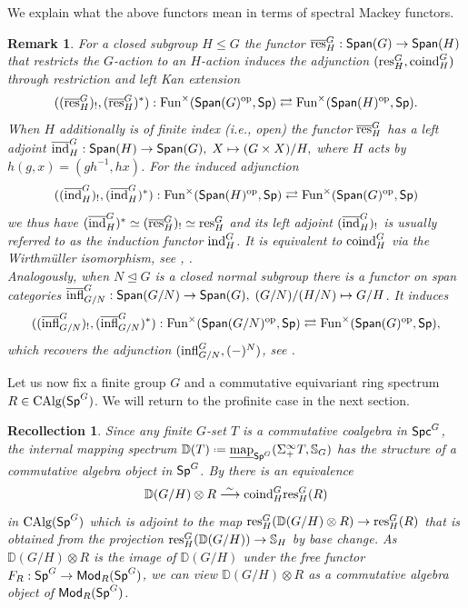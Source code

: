 \documentclass[reqno]{amsart}
\numberwithin{equation}{section}\theoremstyle{thms}
\theoremstyle{defn}
\newtheorem{rem}[equation]{Remark}
\newtheorem{rec}[equation]{Recollection}
\newcommand{\bD}{\mathbb{D}}
\newcommand{\bS}{\mathbb{S}}
\newcommand{\tn}[1]{\textnormal{#1}}
\newcommand{\tsf}[1]{\textsf{\textup{#1}}}
\newcommand{\underl}[1]{\underline{#1}}
\newcommand{\overl}[1]{\overline{#1}}
\newcommand*{\defeq}{\mathrel{\vcenter{\baselineskip0.4ex \lineskiplimit0pt
\hbox{\scriptsize.}\hbox{\scriptsize.}}}%
=}
\newcommand{\op}{\tn{op}}
\newcommand{\fun}{\tn{Fun}}
\newcommand{\imap}{\underl{\tn{map}}}
\newcommand{\calg}{\tn{CAlg}}
\newcommand{\Mod}{\tsf{Mod}}
\newcommand{\Spans}{\tsf{Span}}
\newcommand{\spec}{\tsf{Sp}}
\newcommand{\specg}{\tsf{Sp}^G}
\newcommand{\spcg}{\tsf{Spc}^G}
\begin{document}
We explain what the above functors mean in terms of spectral Mackey functors.

\begin{rem}\label{rem:changeofgroupspectralmackey}
For a closed subgroup $H\leq G$ the functor $\overl{\tn{res}}^G_H: \Spans(G) \to \Spans(H)$ that restricts the $G$-action to an $H$-action induces the adjunction $(\tn{res}^G_H,\tn{coind}^G_H)$ through restriction and left Kan extension
$$((\overl{\tn{res}}^G_H)_!,(\overl{\tn{res}}^G_H)^*): \fun^{\times}(\Spans(G)^{\op},\spec) \rightleftarrows \fun^{\times}(\Spans(H)^{\op},\spec).$$
When $H$ additionally is of finite index (i.e., open) the functor $\overl{\tn{res}}^G_H$ has a left adjoint $\overl{\tn{ind}}^G_H: \Spans(H) \to \Spans(G), \; X \mapsto (G \times X)/H,$ where $H$ acts by $h(g,x)=(gh^{-1},hx)$. For the induced adjunction
$$((\overl{\tn{ind}}^G_H)_!,(\overl{\tn{ind}}^G_H)^*): \fun^{\times}(\Spans(H)^{\op},\spec) \rightleftarrows \fun^{\times}(\Spans(G)^{\op},\spec)$$
we thus have $(\overl{\tn{ind}}^G_H)^* \simeq (\overl{\tn{res}}^G_H)_! \simeq \tn{res}^G_H$ and its left adjoint $(\overl{\tn{ind}}^G_H)_!$ is usually referred to as the \emph{induction functor} $\tn{ind}^G_H$. It is equivalent to $\tn{coind}^G_H$ via the Wirthmüller isomorphism, see \cite[§A.3]{nar17}, \cite[§A]{cmnn24}. \\
Analogously, when $N \trianglelefteq G$ is a closed normal subgroup there is a functor on span categories $\overl{\tn{infl}}^G_{G/N}: \Spans(G/N) \to \Spans(G), \; (G/N)/(H/N) \mapsto G/H$. It induces
$$((\overl{\tn{infl}}^G_{G/N})_!,(\overl{\tn{infl}}^G_{G/N})^*): \fun^{\times}(\Spans(G/N)^{\op},\spec) \rightleftarrows \fun^{\times}(\Spans(G)^{\op},\spec),$$
which recovers the adjunction $(\tn{infl}^G_{G/N},(-)^N)$, see \cite[Example B]{bar17}.
\end{rem}

Let us now fix a finite group $G$ and a commutative equivariant ring spectrum $R \in \calg(\specg)$. We will return to the profinite case in the next section.

\begin{rec}\label{rec:coinddual}
Since any finite $G$-set $T$ is a commutative coalgebra in $\spcg$, the internal mapping spectrum $\bD(T) \defeq \imap_{\specg}(\Sigma^{\infty}_+T, \bS_G)$ has the structure of a commutative algebra object in $\specg$. By \cite[Lemma 3.8]{bchnl25} there is an equivalence 
$$\bD(G/H) \otimes R \stackrel{\sim}{\longrightarrow} \tn{coind}^G_H\tn{res}^G_H(R)$$
in $\calg(\specg)$ which is adjoint to the map $\tn{res}^G_H(\bD(G/H) \otimes R )\to \tn{res}^G_H(R)$ that is obtained from the projection $\tn{res}^G_H(\bD(G/H)) \to \bS_H$ by base change. As $\bD(G/H) \otimes R$ is the image of $\bD(G/H)$ under the free functor $F_R: \specg \to \Mod_R(\specg)$, we can view $\bD(G/H) \otimes R$ as a commutative algebra object of $\Mod_R(\specg)$.
\end{rec}
\end{document}
